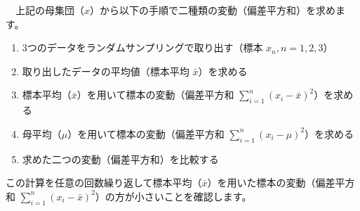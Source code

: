 \documentclass[]{tufte-handout}
\providecommand{\tightlist}{%
  \setlength{\itemsep}{0pt}\setlength{\parskip}{0pt}}
\begin{document}
　上記の母集団（\(x\)）から以下の手順で二種類の変動（偏差平方和）を求めます。

\begin{enumerate}
\def\labelenumi{\arabic{enumi}.}
\tightlist
\item
  3つのデータをランダムサンプリングで取り出す（標本
  \(x_n, n = 1, 2, 3\)）
\item
  取り出したデータの平均値（標本平均 \(\bar{x}\)）を求める
\item
  標本平均（\(\bar{x}\)）を用いて標本の変動（偏差平方和
  \(\sum_{i = 1}^{n}(x_i - \bar{x})^2\)）を求める
\item
  母平均（\(\mu\)）を用いて標本の変動（偏差平方和
  \(\sum_{i = 1}^{n}(x_i - \mu)^2\)）を求める
\item
  求めた二つの変動（偏差平方和）を比較する
\end{enumerate}

この計算を任意の回数繰り返して標本平均（\(\bar{x}\)）を用いた標本の変動（偏差平方和
\(\sum_{i = 1}^{n}(x_i - \bar{x})^2\)）の方が小さいことを確認します。
\end{document}
